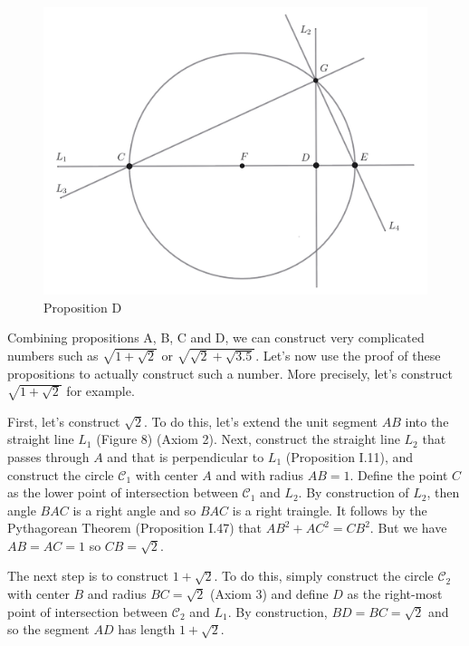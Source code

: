 \documentclass{article}
\theoremstyle{plain}
\theoremstyle{definition}
\begin{document}
\begin{figure}[h!]
    \centering
    \includegraphics[scale=0.38]{pics/PropD.png}
    \caption{Proposition D}
\end{figure}

Combining propositions A, B, C and D, we can construct very complicated numbers such as $\sqrt{1 + \sqrt{2}}$ or $\sqrt{\sqrt{2} + \sqrt{3.5}}$. Let's now use the proof of these propositions to actually construct such a number. More precisely, let's construct $\sqrt{1 + \sqrt{2}}$ for example.

First, let's construct $\sqrt{2}$. To do this, let's extend the unit segment $AB$ into the straight line $L_1$ (Figure 8) (Axiom 2). Next, construct the straight line $L_2$ that passes through $A$ and that is perpendicular to $L_1$ (Proposition I.11), and construct the circle $\mathcal{C}_1$ with center $A$ and with radius $AB = 1$. Define the point $C$ as the lower point of intersection between $\mathcal{C}_1$ and $L_2$. By construction of $L_2$, then angle $BAC$ is a right angle and so $BAC$ is a right traingle. It follows by the Pythagorean Theorem (Proposition I.47) that $AB^2 + AC^2 = CB^2$. But we have $AB = AC = 1$ so $CB = \sqrt{2}$.

The next step is to construct $1 + \sqrt{2}$. To do this, simply construct the circle $\mathcal{C}_2$ with center $B$ and radius $BC = \sqrt{2}$ (Axiom 3) and define $D$ as the right-most point of intersection between $\mathcal{C}_2$ and $L_1$. By construction, $BD = BC = \sqrt{2}$ and so the segment $AD$ has length $1 + \sqrt{2}$.
\end{document}
